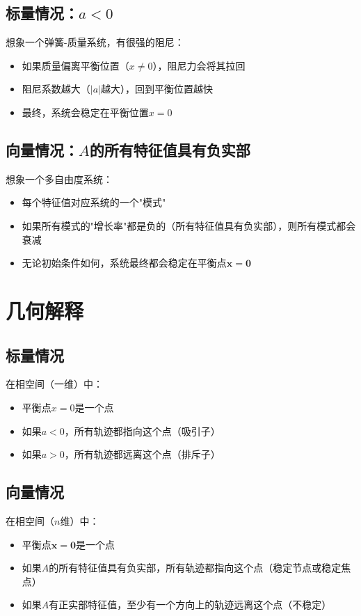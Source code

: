 \documentclass[12pt,a4paper]{article}
\begin{document}
\subsection{标量情况：$a < 0$}

想象一个弹簧-质量系统，有很强的阻尼：
\begin{itemize}
\item 如果质量偏离平衡位置（$x \neq 0$），阻尼力会将其拉回
\item 阻尼系数越大（$|a|$越大），回到平衡位置越快
\item 最终，系统会稳定在平衡位置$x = 0$
\end{itemize}

\subsection{向量情况：$A$的所有特征值具有负实部}

想象一个多自由度系统：
\begin{itemize}
\item 每个特征值对应系统的一个"模式"
\item 如果所有模式的"增长率"都是负的（所有特征值具有负实部），则所有模式都会衰减
\item 无论初始条件如何，系统最终都会稳定在平衡点$\mathbf{x} = \mathbf{0}$
\end{itemize}

\section{几何解释}

\subsection{标量情况}

在相空间（一维）中：
\begin{itemize}
\item 平衡点$x = 0$是一个点
\item 如果$a < 0$，所有轨迹都指向这个点（吸引子）
\item 如果$a > 0$，所有轨迹都远离这个点（排斥子）
\end{itemize}

\subsection{向量情况}

在相空间（$n$维）中：
\begin{itemize}
\item 平衡点$\mathbf{x} = \mathbf{0}$是一个点
\item 如果$A$的所有特征值具有负实部，所有轨迹都指向这个点（稳定节点或稳定焦点）
\item 如果$A$有正实部特征值，至少有一个方向上的轨迹远离这个点（不稳定）
\end{itemize}
\end{document}
